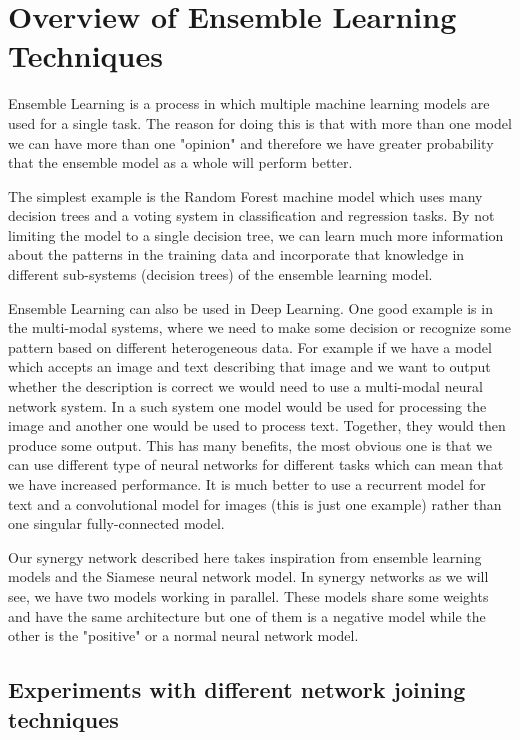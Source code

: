 \documentclass[b5paper]{book}
\begin{document}
\chapter{Overview of Ensemble Learning Techniques}

Ensemble Learning is a process in which multiple machine learning models are used for a single task. The reason for doing this is that with more than one model we can have more than one "opinion" and therefore we have greater probability that the ensemble model as a whole will perform better.

The simplest example is the Random Forest machine model which uses many decision trees and a voting system in classification and regression tasks. By not limiting the model to a single decision tree, we can learn much more information about the patterns in the training data and incorporate that knowledge in different sub-systems (decision trees) of the ensemble learning model.

Ensemble Learning can also be used in Deep Learning. One good example is in the multi-modal systems, where we need to make some decision or recognize some pattern based on different heterogeneous data. For example if we have a model which accepts an image and text describing that image and we want to output whether the description is correct we would need to use a multi-modal neural network system. In a such system one model would be used for processing the image and another one would be used to process text. Together, they would then produce some output. This has many benefits, the most obvious one is that we can use different type of neural networks for different tasks which can mean that we have increased performance. It is much better to use a recurrent model for text and a convolutional model for images (this is just one example) rather than one singular fully-connected model.

Our synergy network described here takes inspiration from ensemble learning models and the Siamese neural network model. In synergy networks as we will see, we have two models working in parallel. These models share some weights and have the same architecture but one of them is a negative model while the other is the "positive" or a normal neural network model.

\section{Experiments with different network joining techniques}
\end{document}
